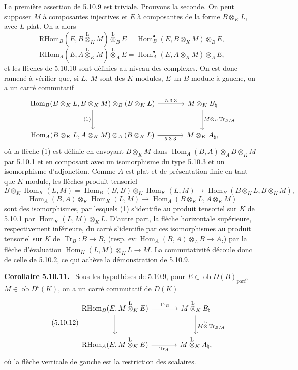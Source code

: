 \documentclass[11pt]{article}
\newenvironment{statement}[1]{\par\medskip\noindent\textbf{#1.}\ }{\par\medskip}
\DeclareMathOperator{\Hom}{Hom}
\newcommand{\ob}{\operatorname{ob}}
\providecommand{\RHom}{\mathrm{RHom}}
\providecommand{\Tr}{\operatorname{Tr}}
\providecommand{\Tr}{\operatorname{Tr}}
\providecommand{\lten}{\overset{\mathrm L}{\otimes}}
\providecommand{\Tr}{\operatorname{Tr}}
\providecommand{\RHom}{\mathrm{RHom}}
\providecommand{\Hom}{\operatorname{Hom}}
\providecommand{\ob}{\operatorname{ob}}
\providecommand{\lten}{\overset{\mathrm L}{\otimes}}
\providecommand{\RHom}{\mathrm R\mathcal{H}om}
\providecommand{\lten}{\overset{\mathrm L}{\otimes}}
\providecommand{\Tr}{\operatorname{Tr}}
\providecommand{\lten}{\overset{\mathrm L}{\otimes}}
\providecommand{\lten}{\overset{\mathrm L}{\otimes}}
\providecommand{\lten}{\overset{\mathrm L}{\otimes}}
\providecommand{\RHom}{\mathrm{RHom}}
\providecommand{\Hom}{\operatorname{Hom}}
\providecommand{\Tr}{\operatorname{Tr}}
\providecommand{\lten}{\overset{\mathrm L}{\otimes}}
\begin{document}
La première assertion de 5.10.9 est triviale. Prouvons la seconde. On peut supposer $M$ à composantes injectives et $E$ à composantes de la forme $B\otimes_KL$, avec $L$ plat. On a alors
\[
\RHom_B(E,B\lten_KM)\lten_BE=\Hom_B^\bullet(E,B\otimes_KM)\otimes_BE,
\]
\[
\RHom_A(E,A\lten_KM)\lten_AE=\Hom_A^\bullet(E,A\otimes_KM)\otimes_AE,
\]
et les flèches de 5.10.10 sont définies au niveau des complexes. On est donc ramené à vérifier que, si $L$, $M$ sont des $K$-modules, $E$ un $B$-module à gauche, on a un carré commutatif
\[
\begin{tikzcd}[column sep=large,row sep=large]
\Hom_B(B\otimes_KL,B\otimes_KM)\otimes_B(B\otimes_KL) \arrow[r,"5.3.3"] \arrow[d,"(1)"'] & M\otimes_KB_\natural \arrow[d,"M\otimes_K\Tr_{B/A}"]\\
\Hom_A(B\otimes_KL,A\otimes_KM)\otimes_A(B\otimes_KL) \arrow[r,"5.3.3"'] & M\otimes_KA_\natural,
\end{tikzcd}
\]
où la flèche (1) est définie en envoyant $B\otimes_KM$ dans $\Hom_A(B,A)\otimes_AB\otimes_KM$ par 5.10.1 et en composant avec un isomorphisme du type 5.10.3 et un isomorphisme d'adjonction. Comme $A$ est plat et de présentation finie en tant que $K$-module, les flèches produit tensoriel
\[
B\otimes_K\Hom_K(L,M)=\Hom_B(B,B)\otimes_K\Hom_K(L,M)\to\Hom_B(B\otimes_KL,B\otimes_KM),
\]
\[
\Hom_A(B,A)\otimes_K\Hom_K(L,M)\to\Hom_A(B\otimes_KL,A\otimes_KM)
\]
sont des isomorphismes, par lesquels (1) s'identifie au produit tensoriel sur $K$ de 5.10.1 par $\Hom_K(L,M)\otimes_KL$. D'autre part, la flèche horizontale supérieure, respectivement inférieure, du carré s'identifie par ces isomorphismes au produit tensoriel sur $K$ de $\Tr_B:B\to B_\natural$ (resp. $\mathrm{ev}:\Hom_A(B,A)\otimes_AB\to A_\natural$) par la flèche d'évaluation $\Hom_K(L,M)\otimes_KL\to M$. La commutativité découle donc de celle de 5.10.2, ce qui achève la démonstration de 5.10.9.

\begin{statement}{Corollaire 5.10.11}
Sous les hypothèses de 5.10.9, pour $E\in\ob D(B)_{\mathrm{parf}}$, $M\in\ob D^b(K)$, on a un carré commutatif de $D(K)$
\begin{equation}\tag{5.10.12}
\begin{tikzcd}[column sep=large,row sep=large]
\RHom_B(E,M\lten_KE) \arrow[r,"\Tr_B"] \arrow[d] & M\lten_KB_\natural \arrow[d,"M\lten\Tr_{B/A}"]\\
\RHom_A(E,M\lten_KE) \arrow[r,"\Tr_A"'] & M\lten_KA_\natural,
\end{tikzcd}
\end{equation}
où la flèche verticale de gauche est la restriction des scalaires.
\end{statement}
\end{document}
